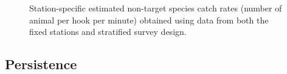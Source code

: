 \documentclass[12pt]{article}\usepackage[]{graphicx}\usepackage[]{color}
\begin{document}
\begin{figure}[htb]

{\centering {} 

}

\caption{Station-specific estimated non-target species catch rates (number of animal per hook per minute) obtained using data from both the fixed stations and stratified survey design.}\label{fig:non-target-spat}
\end{figure}
\hypertarget{persistence}{%
\subsection{Persistence}\label{persistence}}
\end{document}
